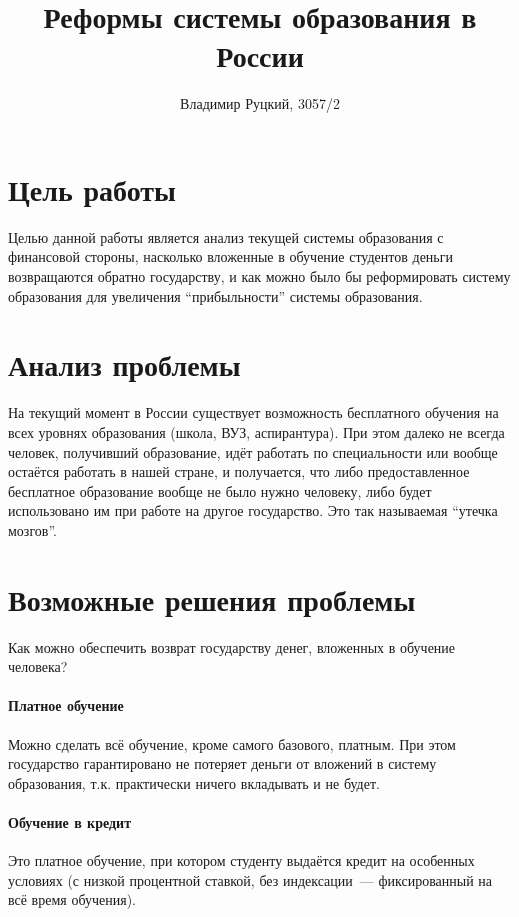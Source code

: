 \documentclass[10pt,a4paper,titlepage]{article}
\title{Реформы системы образования в России}
\author{Владимир Руцкий, 3057/2}
\begin{document}
\titlepage
\maketitle

\section*{Цель работы}
Целью данной работы является анализ текущей системы образования с финансовой стороны, 
насколько вложенные в обучение студентов деньги возвращаются обратно государству, 
и как можно было бы реформировать систему образования для увеличения ``прибыльности'' 
системы образования.

\section*{Анализ проблемы}
На текущий момент в России существует возможность бесплатного обучения на всех уровнях образования 
(школа, ВУЗ, аспирантура).
При этом далеко не всегда человек, получивший образование, 
идёт работать по специальности или вообще остаётся работать в нашей стране, 
и получается, что либо предоставленное бесплатное образование вообще не было нужно человеку, 
либо будет использовано им при работе на другое государство.
Это так называемая ``утечка мозгов''. %

\section*{Возможные решения проблемы}
Как можно обеспечить возврат государству денег, вложенных в обучение человека?

\paragraph{Платное обучение} 
Можно сделать всё обучение, кроме самого базового, платным. 
При этом государство гарантировано не потеряет деньги от вложений в систему образования, 
т.к. практически ничего вкладывать и не будет.

\paragraph{Обучение в кредит}
Это платное обучение, при котором студенту выдаётся кредит на особенных условиях
(с низкой процентной ставкой, без индексации~--- фиксированный на всё время обучения).
\end{document}
